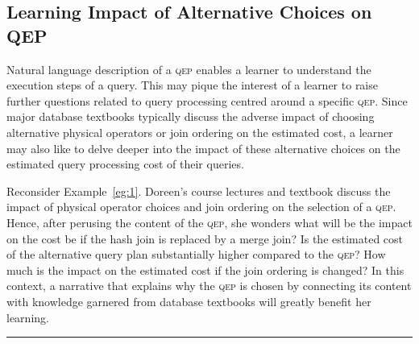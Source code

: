 \documentclass[11pt]{article}
\newcommand{\eat}[1]{}
\def\EndOfProof{\nolinebreak\ \hfill\rule{1.5mm}{2.7mm}}
\begin{document}
\subsection{Learning Impact of Alternative Choices on QEP} \label{sec:impact}
Natural language description of a \textsc{qep} enables a learner to understand the execution steps of a query. This may pique the interest of a learner to raise further questions related to query processing centred around a specific \textsc{qep}. Since major database textbooks typically discuss the adverse impact of choosing alternative physical operators or join ordering on the estimated cost, a learner may also like to delve deeper into the impact of these alternative choices on the estimated query processing cost of their queries.

\eat{This may be due to the shift from extrinsic motivation to intrinsic one to learn about relational query processing.}

\begin{example}  \label{eg:2} 
Reconsider Example~\ref{eg:1}. Doreen's course lectures and textbook discuss the impact of physical operator choices and join ordering  on the selection of a \textsc{qep}. Hence, after perusing the content of the \textsc{qep},  she wonders what will be the impact on the cost be if the hash join is replaced by a merge join? Is the estimated cost of the alternative query plan substantially higher compared to the \textsc{qep}? How much is the impact on the estimated cost if the join ordering is changed?   In this context, a narrative that explains why the \textsc{qep} is chosen by connecting its content with knowledge garnered from database textbooks will greatly benefit her learning. 
\EndOfProof
\end{example}
\end{document}
